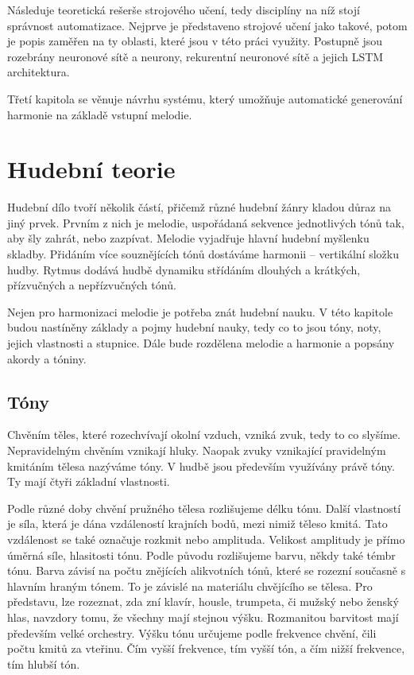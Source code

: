 Následuje teoretická rešerše strojového učení,
tedy disciplíny na níž stojí správnost automatizace.
Nejprve je představeno strojové učení jako takové,
potom je popis zaměřen na ty oblasti, 
které jsou v této práci využity.
Postupně jsou rozebrány neuronové sítě a neurony,
rekurentní neuronové sítě a jejich LSTM architektura.
\par

Třetí kapitola se věnuje návrhu systému,
který umožňuje automatické generování harmonie na základě vstupní melodie.

\chapter{Hudební teorie}
Hudební dílo tvoří několik částí, 
přičemž různé hudební žánry kladou důraz na jiný prvek.
Prvním z nich je melodie, uspořádaná sekvence jednotlivých tónů tak,
aby šly zahrát, nebo zazpívat. 
Melodie vyjadřuje hlavní hudební myšlenku skladby. 
Přidáním více souznějících tónů dostáváme harmonii -- vertikální složku hudby.
Rytmus dodává hudbě dynamiku střídáním dlouhých a krátkých,
přízvučných a nepřízvučných tónů.
\par

Nejen pro harmonizaci melodie je potřeba znát hudební nauku. 
V této kapitole budou nastíněny základy a pojmy hudební nauky, 
tedy co to jsou tóny, noty, jejich vlastnosti a stupnice. 
Dále bude rozdělena melodie a harmonie a popsány akordy a tóniny. 
\par 

\section{Tóny}
Chvěním těles, které rozechvívají okolní vzduch, vzniká zvuk, 
tedy to co slyšíme. 
Nepravidelným chvěním vznikají hluky. 
Naopak zvuky vznikající pravidelným kmitáním tělesa nazýváme tóny. 
V hudbě jsou především využívány právě tóny. 
Ty mají čtyři základní vlastnosti. 
\par

Podle různé doby chvění pružného tělesa rozlišujeme délku tónu. 
Další vlastností je síla, která je dána vzdáleností krajních bodů,
mezi nimiž těleso kmitá.
Tato vzdálenost se také označuje rozkmit nebo amplituda.
Velikost amplitudy je přímo úměrná síle, hlasitosti tónu.
Podle původu rozlišujeme barvu, někdy také témbr tónu.
Barva závisí na počtu znějících alikvotních tónů,
které se rozezní současně s hlavním hraným tónem. 
To je závislé na materiálu chvějícího se tělesa.
Pro představu, lze rozeznat, zda zní klavír, housle, trumpeta, či mužský nebo ženský hlas, 
navzdory tomu, že všechny mají stejnou výšku. 
Rozmanitou barvitost mají především velké orchestry.
Výšku tónu určujeme podle frekvence chvění, čili počtu kmitů za vteřinu. 
Čím vyšší frekvence, tím vyšší tón, a čím nižší frekvence, tím hlubší tón.
\cite{zenkl,cmiral} 
\par


